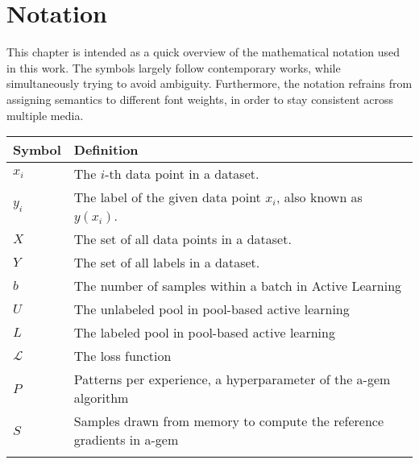 \chapter*{Notation}
\label{ch:notation}

This chapter is intended as a quick overview of the mathematical notation used in this work.
The symbols largely follow contemporary works, while simultaneously trying to avoid ambiguity.
Furthermore, the notation refrains from assigning semantics to different font weights, in order to stay consistent across multiple media.

\begin{tabularx}{\textwidth}{l X}
    \toprule
    Symbol & Definition \\
    \midrule
    $x_i$ & The $i$-th data point in a dataset. \\ \addlinespace
    $y_i$ & The label of the given data point $x_i$, also known as $y(x_i)$. \\ \addlinespace
    $X$ & The set of all data points in a dataset. \\ \addlinespace
    $Y$ & The set of all labels in a dataset. \\ \addlinespace
    $b$ & The number of samples within a batch in Active Learning \\ \addlinespace
    $U$ & The unlabeled pool in pool-based active learning\\ \addlinespace
    $L$ & The labeled pool in pool-based active learning\\ \addlinespace
    $\mathcal{L}$ & The loss function \\ \addlinespace
    $P$ & Patterns per experience, a hyperparameter of the \gls{a-gem} algorithm \\ \addlinespace
    $S$ & Samples drawn from memory to compute the reference gradients in \gls{a-gem} \\ \addlinespace
    \bottomrule
\end{tabularx}
\label{tab:notation}